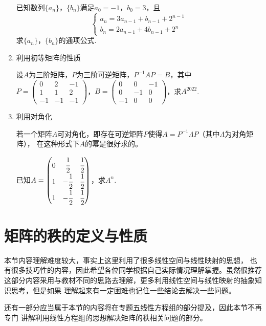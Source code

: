 \begin{enumerate}
	\begin{example}
		已知数列$\{a_n\}$，$\{b_n\}$满足$a_0=-1$，$b_0=3$，且
		$$\begin{cases}
			a_n=3a_{n-1}+b_{n-1}+2^{n-1} \\ b_n=2a_{n-1}+4b_{n-1}+2^n
		\end{cases}$$
		求$\{a_n\}$，$\{b_n\}$的通项公式.
	\end{example}
	\item 利用初等矩阵的性质
	\begin{example}
		设$A$为三阶矩阵，$P$为三阶可逆矩阵，$P^{-1}AP=B$，其中$P=\begin{pmatrix}
			0 & 2 & -1 \\ 1 & 1 & 2 \\ -1 & -1 & -1
		\end{pmatrix}$，$B=\begin{pmatrix}
			0 & 0 & -1 \\ 0 & -1 & 0 \\ -1 & 0 & 0
		\end{pmatrix}$，求$A^{2022}$.
	\end{example}

	\item 利用对角化
	
	若一个矩阵$A$可对角化，即存在可逆矩阵$P$使得$A=P^{-1}\Lambda P$（其中$\Lambda$为对角矩阵），
	在这种形式下$A$的幂是很好求的。
	\begin{example}
		已知$A=\begin{pmatrix}
			0 & \cfrac{1}{2} & \cfrac{1}{2} \\ 1 & -\cfrac{1}{2} & \cfrac{1}{2} \\ 1 & -\cfrac{1}{2} & \cfrac{1}{2}
		\end{pmatrix}$，求$A^n$.
	\end{example}

\end{enumerate}

\section{矩阵的秩的定义与性质}
本节内容理解难度较大，事实上这里利用了很多线性空间与线性映射的思想，
也有很多技巧性的内容，因此希望各位同学根据自己实际情况理解掌握。虽然很推荐
这部分内容采用与教材不同的思路去理解，更多利用线性空间与线性映射的抽象知识思考，但是如果
理解起来有一定困难也记住一些结论去解决一些问题。

还有一部分应当属于本节的内容将在专题五线性方程组的部分提及，因此本节不再专门
讲解利用线性方程组的思想解决矩阵的秩相关问题的部分。

